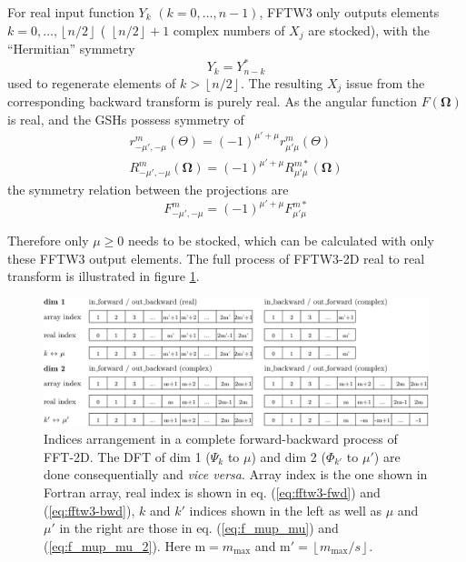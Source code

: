 For real input function $Y_{k}$ $(k=0,\ldots,n-1)$, FFTW3 only outputs
elements $k=0,\ldots,\left\lfloor n/2\right\rfloor $ ( $\left\lfloor n/2\right\rfloor +1$
complex numbers of $X_{j}$ are stocked), with the “Hermitian” symmetry
\begin{equation}
Y_{k}=Y_{n-k}^{*}\label{eq:yk_conjg}
\end{equation}
used to regenerate elements of $k>\left\lfloor n/2\right\rfloor $.
The resulting $X_{j}$ issue from the corresponding backward transform
is purely real. As the angular function $F(\mathbf{\Omega})$ is real,
and the GSHs possess symmetry \citep{Gray-Gubbins,Messiah} of
\begin{equation}
\begin{array}{c}
r_{-\mu',-\mu}^{m}(\Theta)=\left(-1\right)^{\mu'+\mu}r_{\mu'\mu}^{m}(\Theta)\\
R_{-\mu',-\mu}^{m}(\mathbf{\Omega})=\left(-1\right)^{\mu'+\mu}R_{\mu'\mu}^{m*}(\mathbf{\Omega})
\end{array}
\end{equation}
the symmetry relation between the projections are
\begin{equation}
F_{-\mu',-\mu}^{m}=\left(-1\right)^{\mu'+\mu}F_{\mu'\mu}^{m*}\label{eq:symm_f_m_mup_mu}
\end{equation}


Therefore only $\mu\geq0$ needs to be stocked, which can be calculated
with only these FFTW3 output elements. The full process of FFTW3-2D
real to real transform is illustrated in figure \ref{fig:FFTW3-2D-indices}.

\begin{figure}[h]
\centering{}%
\begin{minipage}[t]{1\textwidth}%
\begin{center}
\includegraphics[width=1\textwidth]{_figure/fftw3_indices}
\par\end{center}

\caption [Indices arrangement in a complete forward-backward process of FFT-2D]{Indices arrangement in a complete forward-backward process of FFT-2D.
The DFT of dim 1 ($\Psi_{k}$ to $\mu$) and dim 2 ($\Phi_{k'}$ to
$\mu'$) are done consequentially and \emph{vice versa}. Array index %
is the one shown in Fortran array, real index is shown in eq. (\ref{eq:fftw3-fwd})
and (\ref{eq:fftw3-bwd}), $k$ and $k'$ indices shown in the left
as well as $\mu$ and $\mu'$ in the right are those in eq. (\ref{eq:f_mup_mu})
and (\ref{eq:f_mup_mu_2}). Here $\mathrm{m}=m_{\mathrm{max}}$ and
$\mathrm{m}'=\left\lfloor m_{\mathrm{max}}/s\right\rfloor $. \label{fig:FFTW3-2D-indices}}
%
\end{minipage}
\end{figure}


